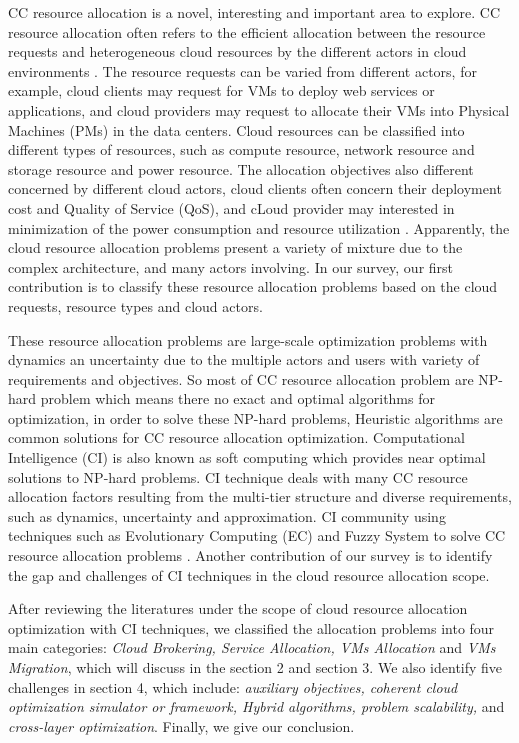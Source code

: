 \documentclass[onecolumn,10pt]{asme2ej}
\begin{document}
CC resource allocation is a novel, interesting and important area to explore. CC resource allocation often refers to the efficient allocation between the resource requests and heterogeneous cloud resources by the different actors in cloud environments \cite{endo2011resource}. The resource requests can be varied from different actors, for example, cloud clients may request for VMs to deploy web services or applications, and cloud providers may request to allocate their VMs into Physical Machines (PMs) in the data centers. Cloud resources can be classified into different types of resources, such as compute resource, network resource and storage resource and power resource. The allocation objectives also different concerned by different cloud actors, cloud clients often concern their deployment cost and Quality of Service (QoS), and cLoud provider may interested in minimization of the power consumption and resource utilization \cite{jennings2015resource}. Apparently, the cloud resource allocation problems present a variety of mixture due to the complex architecture, and many actors involving. In our survey, our first contribution is to classify these resource allocation problems based on the cloud requests, resource types and cloud actors. 

These resource allocation problems are large-scale optimization problems with dynamics an uncertainty due to the multiple actors and users with variety of requirements and objectives. So most of CC resource allocation problem are NP-hard problem which means there no exact and optimal algorithms for optimization, in order to solve these NP-hard problems, Heuristic algorithms are common solutions for CC resource allocation optimization. Computational Intelligence (CI) is also known as soft computing which provides near optimal solutions to NP-hard problems. CI technique deals with many CC resource allocation factors resulting from the multi-tier structure and diverse requirements, such as dynamics, uncertainty and approximation. CI community using techniques such as Evolutionary Computing (EC) and Fuzzy System to solve CC resource allocation problems \cite{guzek2015survey}. 
Another contribution of our survey is to identify the gap and challenges of CI techniques in the cloud resource allocation scope.

After reviewing the literatures under the scope of cloud resource allocation optimization with CI techniques, we classified the allocation problems into four main categories: \emph{Cloud Brokering, Service Allocation, VMs Allocation} and \emph{VMs Migration}, which will discuss in the section 2 and section 3. We also identify five challenges in section 4, which include: \emph{auxiliary objectives, coherent cloud optimization simulator or framework, Hybrid algorithms, problem scalability,} and \emph{cross-layer optimization}. Finally, we give our conclusion.
\end{document}
